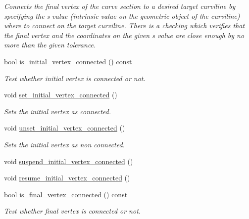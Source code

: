 \begin{DoxyCompactItemize}
\begin{DoxyCompactList}\small\item\em Connects the final vertex of the curve section to a desired target curviline by specifying the s value (intrinsic value on the geometric object of the curviline) where to connect on the target curviline. There is a checking which verifies that the final vertex and the coordinates on the given s value are close enough by no more than the given tolerance. \end{DoxyCompactList}\item 
bool \hyperlink{classoomph_1_1TriangleMeshCurveSection_aaab51c1395c75a85bf761e09ddcd1b28}{is\+\_\+initial\+\_\+vertex\+\_\+connected} () const
\begin{DoxyCompactList}\small\item\em Test whether initial vertex is connected or not. \end{DoxyCompactList}\item 
void \hyperlink{classoomph_1_1TriangleMeshCurveSection_ab3294da2b5f14d38e19f2b64684f3074}{set\+\_\+initial\+\_\+vertex\+\_\+connected} ()
\begin{DoxyCompactList}\small\item\em Sets the initial vertex as connected. \end{DoxyCompactList}\item 
void \hyperlink{classoomph_1_1TriangleMeshCurveSection_a6175f89dbb33a53d596e9374857cbefb}{unset\+\_\+initial\+\_\+vertex\+\_\+connected} ()
\begin{DoxyCompactList}\small\item\em Sets the initial vertex as non connected. \end{DoxyCompactList}\item 
void \hyperlink{classoomph_1_1TriangleMeshCurveSection_ade6528a99d26583c05a5fd44e21d1ec4}{suspend\+\_\+initial\+\_\+vertex\+\_\+connected} ()
\item 
void \hyperlink{classoomph_1_1TriangleMeshCurveSection_a34923cad75967b4efa95ad6e1ea3c72e}{resume\+\_\+initial\+\_\+vertex\+\_\+connected} ()
\item 
bool \hyperlink{classoomph_1_1TriangleMeshCurveSection_a937df77a1a0d3bf60f0a52ab3c0e268d}{is\+\_\+final\+\_\+vertex\+\_\+connected} () const
\begin{DoxyCompactList}\small\item\em Test whether final vertex is connected or not. \end{DoxyCompactList}\item 

\end{DoxyCompactItemize}
